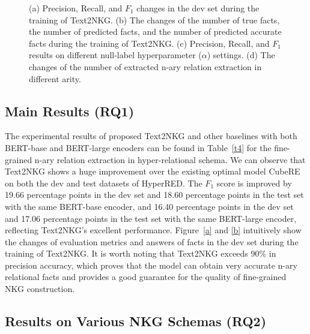 \documentclass{article} \usepackage{iclr2024_conference,times}
\begin{document}
\begin{figure*}[h!t]
    \centering
	\caption{(a) Precision, Recall, and $F_1$ changes in the dev set during the training of Text2NKG. (b) The changes of the number of true facts, the number of predicted facts, and the number of predicted accurate facts during the training of Text2NKG. (c) Precision, Recall, and $F_1$ results on different null-label hyperparameter ($\alpha$) settings. (d) The changes of the number of extracted n-ary
  relation extraction in different arity.}
	\label{f3}
\end{figure*}



\subsection{Main Results (RQ1)}

The experimental results of proposed Text2NKG and other baselines with both BERT-base and BERT-large encoders can be found in Table~\ref{t4} for the fine-grained n-ary relation extraction in hyper-relational schema. We can observe that Text2NKG shows a huge improvement over the existing optimal model CubeRE on both the dev and test datasets of HyperRED. The $F_1$ score is improved by 19.66 percentage points in the dev set and 18.60 percentage points in the test set with the same BERT-base encoder, and 16.40 percentage points in the dev set and 17.06 percentage points in the test set with the same BERT-large encoder, reflecting Text2NKG's excellent performance. Figure~\ref{a} and \ref{b} intuitively show the changes of evaluation metrics and answers of facts in the dev set during the training of Text2NKG. It is worth noting that Text2NKG exceeds 90\% in precision accuracy, which proves that the model can obtain very accurate n-ary relational facts and provides a good guarantee for the quality of fine-grained NKG construction.

\subsection{Results on Various NKG Schemas (RQ2)}
\end{document}
